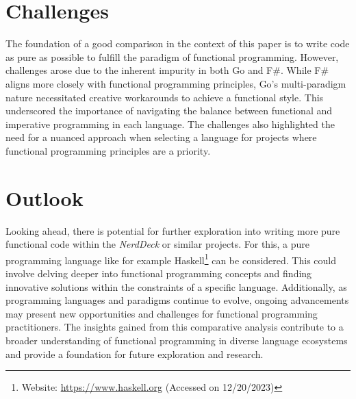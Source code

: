     \section{Challenges}\label{sec:challenges}
    The foundation of a good comparison in the context of this paper is to write code as pure as possible to fulfill the paradigm of functional programming. However, challenges arose due to the inherent impurity in both Go and F\#. While F\# aligns more closely with functional programming principles, Go's multi-paradigm nature necessitated creative workarounds to achieve a functional style. This underscored the importance of navigating the balance between functional and imperative programming in each language. The challenges also highlighted the need for a nuanced approach when selecting a language for projects where functional programming principles are a priority.        

    \section{Outlook}\label{sec:outlook}
    Looking ahead, there is potential for further exploration into writing more pure functional code within the \textit{NerdDeck} or similar projects. For this, a pure programming language like for example Haskell\footnote{Website: \url{https://www.haskell.org} (Accessed on 12/20/2023)} can be considered. This could involve delving deeper into functional programming concepts and finding innovative solutions within the constraints of a specific language. Additionally, as programming languages and paradigms continue to evolve, ongoing advancements may present new opportunities and challenges for functional programming practitioners. The insights gained from this comparative analysis contribute to a broader understanding of functional programming in diverse language ecosystems and provide a foundation for future exploration and research.
